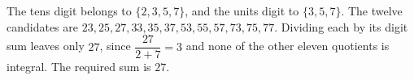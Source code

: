 The tens digit belongs to $\{2,3,5,7\}$, and the units digit to $\{3,5,7\}$. The twelve candidates are $23,25,27,33,35,37,53,55,57,73,75,77$. Dividing each by its digit sum leaves only $27$, since $\dfrac{27}{2+7}=3$ and none of the other eleven quotients is integral. The required sum is $\boxed{27}$.
